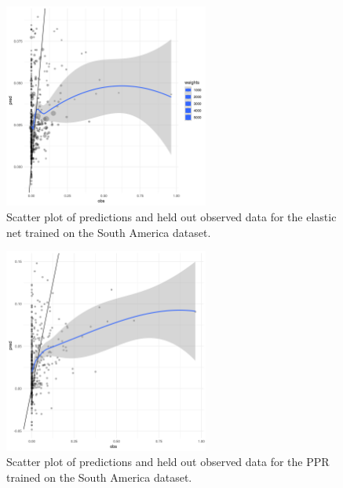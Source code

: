 \documentclass[review]{elsarticle}
\begin{document}
\begin{figure}[h!]
  \centering
  \includegraphics[width=0.6\textwidth]{figs/SI/enet_obspred_sa.png}
\caption{
  Scatter plot of predictions and held out observed data for the elastic net trained on the South America dataset.
}

\end{figure}


\begin{figure}[h!]
  \centering
  \includegraphics[width=0.6\textwidth]{figs/SI/ppr_obspred_sa.png}
\caption{
  Scatter plot of predictions and held out observed data for the PPR trained on the South America dataset.
}

\end{figure}
\end{document}
